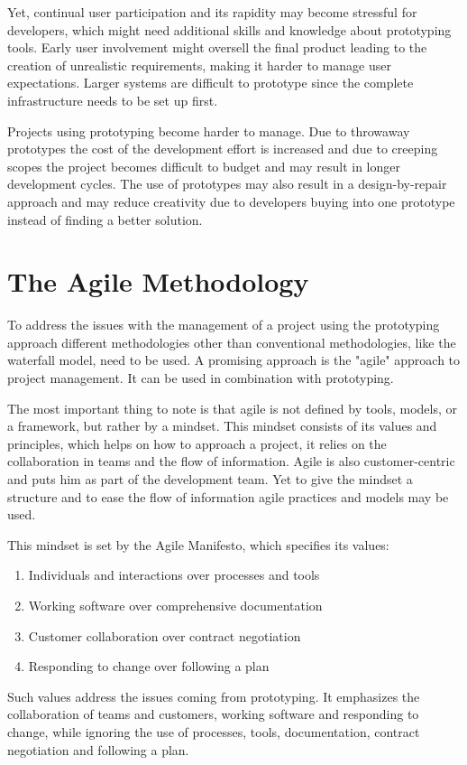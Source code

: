 \documentclass[runningheads]{llncs}
\begin{document}
Yet, continual user participation and its rapidity may become stressful for developers, which might need additional skills and knowledge about
prototyping tools. Early user involvement might oversell the final product leading to the creation of unrealistic requirements, making it harder 
to manage user expectations. Larger systems are difficult to prototype since the complete infrastructure needs to be set up first\cite{ref_prac}.

Projects using prototyping become harder to manage. Due to throwaway prototypes the cost of the development effort is increased 
and due to creeping scopes\cite{ref_featurecreep} the project becomes difficult to budget and may result in longer development cycles. 
The use of prototypes may also result in a design-by-repair approach and may reduce creativity due to developers buying into one 
prototype instead of finding a better solution.

\section{The Agile Methodology}
To address the issues with the management of a project using the prototyping approach different methodologies other than 
conventional methodologies, like the waterfall model, need to be used. A promising approach is the "agile" approach
to project management. It can be used in combination with prototyping.

The most important thing to note is that agile is not defined by tools, models, or a framework, but rather by a mindset\cite{ref_agilemanifesto}. 
This mindset consists  of its values and principles, which helps on how to approach a project, it relies on the collaboration 
in teams and the flow of information. Agile is also customer-centric and puts him as part of the development team. Yet to 
give the mindset a structure and to ease the flow of information agile practices and models may be used.

This mindset is set by the Agile Manifesto\cite{ref_agilemanifesto}, which specifies its values:
\begin{enumerate}
  \item Individuals and interactions over processes and tools
  \item Working software over comprehensive documentation
  \item Customer collaboration over contract negotiation
  \item Responding to change over following a plan 
\end{enumerate}
Such values address the issues coming from prototyping. It emphasizes the collaboration of teams and customers, working software
and responding to change, while ignoring the use of processes, tools, documentation, contract negotiation and following a plan.
\end{document}
